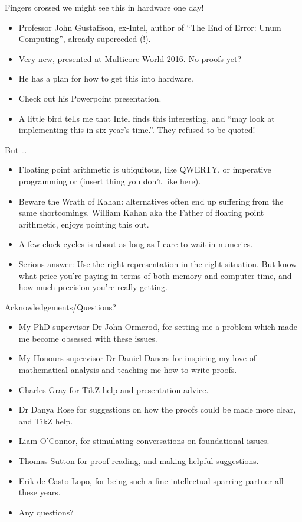 \documentclass{beamer}
\begin{document}
\begin{frame}{Fingers crossed we might see this in hardware one day!}
\begin{itemize}
\item Professor John Gustaffson, ex-Intel, author of ``The End of Error: Unum Computing'',
			already superceded (!).
\item Very new, presented at Multicore World 2016. No proofs yet?
\item He has a plan for how to get this into hardware.
\item Check out his Powerpoint presentation.
\item A little bird tells me that Intel finds this interesting, and ``may look at implementing this in
			six year's time.''. They refused to be quoted!
\end{itemize}
\end{frame}


\begin{frame}{But \ldots}
\begin{itemize}
\item Floating point arithmetic is ubiquitous, like QWERTY, or imperative programming or (insert thing
			you don't like here).
\item Beware the Wrath of Kahan: alternatives often end up suffering from the same shortcomings. 
			William Kahan aka the Father of floating point arithmetic, enjoys pointing this out.
\item A few clock cycles is about as long as I care to wait in numerics.
\item Serious answer: Use the right representation in the right situation. But know what price you're paying 				in terms of both memory and computer time, and how much precision you're really getting.
\end{itemize}
\end{frame}


\begin{frame}{Acknowledgements/Questions?}
\begin{itemize}
\item My PhD supervisor Dr John Ormerod, for setting me a problem which made me become obsessed with these
			issues.
\item My Honours supervisor Dr Daniel Daners for inspiring my love of mathematical analysis and teaching
			me how to write proofs.
\item Charles Gray for TikZ help and presentation advice.
\item Dr Danya Rose for suggestions on how the proofs could be made more clear, and TikZ help.
\item Liam O'Connor, for stimulating conversations on foundational issues.
\item Thomas Sutton for proof reading, and making helpful suggestions.
\item Erik de Casto Lopo, for being such a fine intellectual sparring partner all these years.
\item Any questions?
\end{itemize}
\end{frame}
\end{document}
